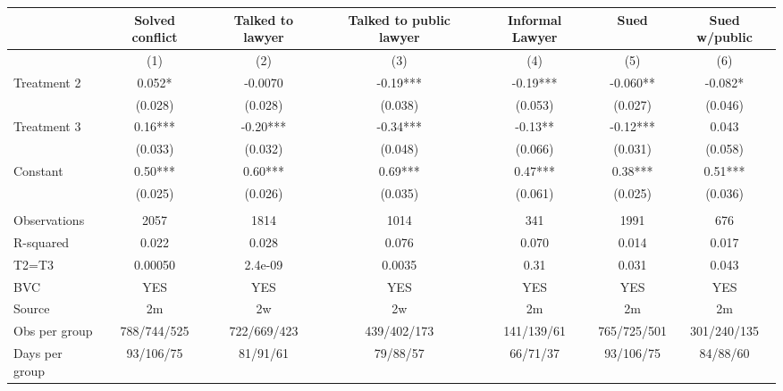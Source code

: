 \begin{tabular}{lcccccc}
\toprule
      & Solved conflict & Talked to lawyer & Talked to public lawyer & Informal Lawyer & Sued  & Sued w/public \\
\midrule
\midrule
      & (1)   & (2)   & (3)   & (4)   & (5)   & (6) \\
\midrule
\midrule
Treatment 2 & 0.052* & -0.0070 & -0.19*** & -0.19*** & -0.060** & -0.082* \\
      & (0.028) & (0.028) & (0.038) & (0.053) & (0.027) & (0.046) \\
Treatment 3 & 0.16*** & -0.20*** & -0.34*** & -0.13** & -0.12*** & 0.043 \\
      & (0.033) & (0.032) & (0.048) & (0.066) & (0.031) & (0.058) \\
Constant  & 0.50*** & 0.60*** & 0.69*** & 0.47*** & 0.38*** & 0.51*** \\
      & (0.025) & (0.026) & (0.035) & (0.061) & (0.025) & (0.036) \\
      &       &       &       &       &       &  \\
\midrule
Observations & 2057  & 1814  & 1014  & 341   & 1991  & 676 \\
R-squared & 0.022 & 0.028 & 0.076 & 0.070 & 0.014 & 0.017 \\
T2=T3 & 0.00050 & 2.4e-09 & 0.0035 & 0.31  & 0.031 & 0.043 \\
BVC   & YES   & YES   & YES   & YES   & YES   & YES \\
Source & 2m    & 2w    & 2w    & 2m    & 2m    & 2m \\
Obs per group & 788/744/525 & 722/669/423 & 439/402/173 & 141/139/61 & 765/725/501 & 301/240/135 \\
Days per group & 93/106/75 & 81/91/61 & 79/88/57 & 66/71/37 & 93/106/75 & 84/88/60 \\
\bottomrule
\bottomrule
\end{tabular}%
